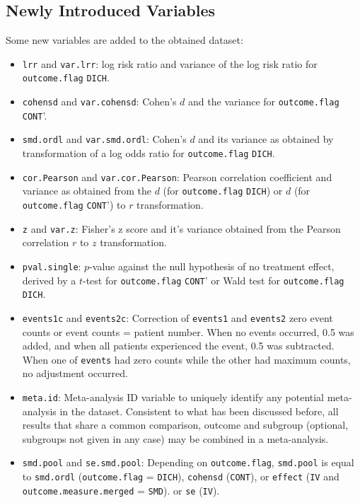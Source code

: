 \documentclass[11pt,a4paper,twoside]{book}\usepackage[]{graphicx}\usepackage[]{color}
\begin{document}
\subsection{Newly Introduced Variables}
Some new variables are added to the obtained dataset:
\begin{itemize}
\item \texttt{lrr} and \texttt{var.lrr}: log risk ratio and variance of the log risk ratio for \texttt{outcome.flag} \texttt{DICH}.
\item \texttt{cohensd} and \texttt{var.cohensd}: Cohen's $d$ and the variance for \texttt{outcome.flag} \texttt{CONT}'. 
\item \texttt{smd.ordl} and \texttt{var.smd.ordl}: Cohen's $d$ and its variance as obtained by transformation of a log odds ratio for \texttt{outcome.flag} \texttt{DICH}.
\item \texttt{cor.Pearson} and \texttt{var.cor.Pearson}: Pearson correlation coefficient and variance as obtained from the $d$ (for \texttt{outcome.flag} \texttt{DICH}) or $d$ (for \texttt{outcome.flag} \texttt{CONT}') to $r$ transformation.
\item \texttt{z} and \texttt{var.z}: Fisher's z score and it's variance obtained from the Pearson correlation $r$ to $z$ transformation.
\item \texttt{pval.single}: $p$-value against the null hypothesis of no treatment effect, derived by a $t$-test for \texttt{outcome.flag} \texttt{CONT}' or Wald test for \texttt{outcome.flag} \texttt{DICH}.
\item \texttt{events1c} and \texttt{events2c}: Correction of \texttt{events1} and \texttt{events2} zero event counts or event counts = patient number. When no events occurred, 0.5 was added, and when all patients experienced the event, 0.5 was subtracted. When one of \texttt{events} had zero counts while the other had maximum counts, no adjustment occurred.
\item \texttt{meta.id}: Meta-analysis ID variable to uniquely identify any potential meta-analysis in the dataset. Consistent to what has been discussed before, all results that share a common comparison, outcome and subgroup (optional, subgroups not given in any case) may be combined in a meta-analysis.
\item \texttt{smd.pool} and \texttt{se.smd.pool}: Depending on \texttt{outcome.flag}, \texttt{smd.pool} is equal to \texttt{smd.ordl} (\texttt{outcome.flag} = \texttt{DICH}), \texttt{cohensd} (\texttt{CONT}), or \texttt{effect} (\texttt{IV} and \texttt{outcome.measure.merged} = \texttt{SMD}).
or \texttt{se} (\texttt{IV}).
\end{itemize}
\end{document}
